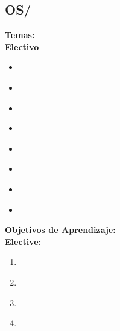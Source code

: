 \subsection{OS/\OSFileSystems}\label{sec:BOK:OSFileSystems}
\noindent \textbf{Temas:}\\
\noindent \textbf{Electivo}
\begin{itemize}
	\item \OSFileSystemsTopicFiles\label{sec:BOK:OSFileSystemsTopicFiles}
	\item \OSFileSystemsTopicDirectories\label{sec:BOK:OSFileSystemsTopicDirectories}
	\item \OSFileSystemsTopicFile\label{sec:BOK:OSFileSystemsTopicFile}
	\item \OSFileSystemsTopicStandard\label{sec:BOK:OSFileSystemsTopicStandard}
	\item \OSFileSystemsTopicMemory\label{sec:BOK:OSFileSystemsTopicMemory}
	\item \OSFileSystemsTopicSpecial\label{sec:BOK:OSFileSystemsTopicSpecial}
	\item \OSFileSystemsTopicNaming\label{sec:BOK:OSFileSystemsTopicNaming}
	\item \OSFileSystemsTopicJournaling\label{sec:BOK:OSFileSystemsTopicJournaling}
\end{itemize}


\noindent \textbf{Objetivos de Aprendizaje:}\\
\noindent \textbf{Elective:}
\begin{enumerate}
	\setcounter{enumi}{0}
	\item \OSFileSystemsLODescribeTheBe\xspace[\OSFileSystemsLODescribeTheBeLevel]\label{sec:BOK:OSFileSystemsLODescribeTheBe}
	\item \OSFileSystemsLOCompareAndApproachesOrganization\xspace[\OSFileSystemsLOCompareAndApproachesOrganizationLevel]\label{sec:BOK:OSFileSystemsLOCompareAndApproachesOrganization}
	\item \OSFileSystemsLOSummarizeHow\xspace[\OSFileSystemsLOSummarizeHowLevel]\label{sec:BOK:OSFileSystemsLOSummarizeHow}
	\item \OSFileSystemsLOSummarizeTheJournaling\xspace[\OSFileSystemsLOSummarizeTheJournalingLevel]\label{sec:BOK:OSFileSystemsLOSummarizeTheJournaling}
\end{enumerate}


